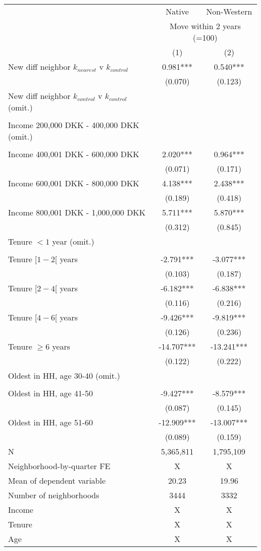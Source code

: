 \begin{tabular}{lcc}
\toprule
 & Native & Non-Western \\ 
\cmidrule(lr){2-2} \cmidrule(lr){3-3}
 & \multicolumn{2}{c}{Move within 2 years (=100)} \\ 
\cmidrule(lr){2-3}
  & (1) & (2) \\ 
\midrule
New diff neighbor $k_{nearest}$ v $k_{control}$ & 0.981*** & 0.540*** \\ 
 & (0.070) & (0.123) \\ 
New diff neighbor $k_{control}$ v $k_{control}$ (omit.) & & \\ 
 &   &   \\ 
Income 200,000 DKK - 400,000 DKK (omit.) &  &  \\ 
 & &  \\ 
Income 400,001 DKK - 600,000 DKK & 2.020*** & 0.964*** \\ 
 & (0.071) & (0.171) \\ 
Income 600,001 DKK - 800,000 DKK & 4.138*** & 2.438*** \\ 
 & (0.189) & (0.418) \\ 
Income 800,001 DKK - 1,000,000 DKK & 5.711*** & 5.870*** \\ 
 & (0.312) & (0.845) \\ 
 Tenure $<1$ year (omit.) &  &  \\ 
 &  &  \\ 
 Tenure $[1-2[$ years & -2.791*** & -3.077*** \\ 
 & (0.103) & (0.187) \\ 
Tenure $[2-4[$ years & -6.182*** & -6.838*** \\ 
 & (0.116) & (0.216) \\ 
Tenure $[4-6[$ years & -9.426*** & -9.819*** \\ 
 & (0.126) & (0.236) \\ 
Tenure $\geq 6$ years & -14.707*** & -13.241*** \\ 
 & (0.122) & (0.222) \\ 
 Oldest in HH, age 30-40 (omit.) &  &  \\ 
 &  &  \\ 
Oldest in HH, age 41-50 & -9.427*** & -8.579*** \\ 
 & (0.087) & (0.145) \\ 
Oldest in HH, age 51-60 & -12.909*** & -13.007*** \\ 
 & (0.089) & (0.159) \\ 
N & 5,365,811 & 1,795,109 \\ 
Neighborhood-by-quarter FE & X & X \\ 
Mean of dependent variable & 20.23 & 19.96 \\ 
Number of neighborhoods & 3444 & 3332 \\ 
Income & X & X \\ 
Tenure & X & X \\ 
Age & X & X \\ 
\bottomrule
\end{tabular}